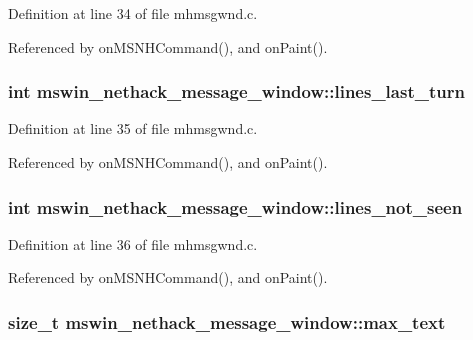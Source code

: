 Definition at line 34 of file mhmsgwnd.\+c.



Referenced by on\+M\+S\+N\+H\+Command(), and on\+Paint().

\hypertarget{structmswin__nethack__message__window_a15ac3ae0e42d4bf54132068138905b66}{
\subsubsection[{lines\+\_\+last\+\_\+turn}]{\setlength{\rightskip}{0pt plus 5cm}int mswin\+\_\+nethack\+\_\+message\+\_\+window\+::lines\+\_\+last\+\_\+turn}}\label{structmswin__nethack__message__window_a15ac3ae0e42d4bf54132068138905b66}


Definition at line 35 of file mhmsgwnd.\+c.



Referenced by on\+M\+S\+N\+H\+Command(), and on\+Paint().

\hypertarget{structmswin__nethack__message__window_a03376eec1493f3cbe10aa7608b06da71}{
\subsubsection[{lines\+\_\+not\+\_\+seen}]{\setlength{\rightskip}{0pt plus 5cm}int mswin\+\_\+nethack\+\_\+message\+\_\+window\+::lines\+\_\+not\+\_\+seen}}\label{structmswin__nethack__message__window_a03376eec1493f3cbe10aa7608b06da71}


Definition at line 36 of file mhmsgwnd.\+c.



Referenced by on\+M\+S\+N\+H\+Command(), and on\+Paint().

\hypertarget{structmswin__nethack__message__window_aa5bff51a92ce67744b3df06ad74fbc92}{
\subsubsection[{max\+\_\+text}]{\setlength{\rightskip}{0pt plus 5cm}size\+\_\+t mswin\+\_\+nethack\+\_\+message\+\_\+window\+::max\+\_\+text}}\label{structmswin__nethack__message__window_aa5bff51a92ce67744b3df06ad74fbc92}


